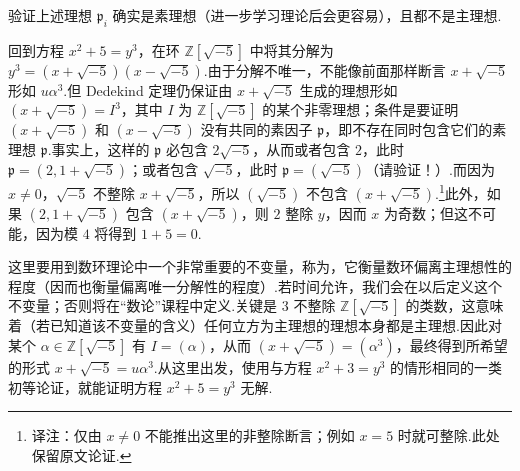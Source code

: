 \begin{exercise*}
验证上述理想 $\mathfrak p_i$ 确实是素理想（进一步学习理论后会更容易），且都不是主理想.
\end{exercise*}
回到方程 $x^2+5=y^3$，在环 $\mathbb Z[\sqrt{-5}]$ 中将其分解为 $y^3=(x+\sqrt{-5})(x-\sqrt{-5})$.由于分解不唯一，不能像前面那样断言 $x+\sqrt{-5}$ 形如 $u\alpha^3$.但 Dedekind 定理仍保证由 $x+\sqrt{-5}$ 生成的理想形如 $(x+\sqrt{-5})=I^3$，其中 $I$ 为 $\mathbb Z[\sqrt{-5}]$ 的某个非零理想；条件是要证明 $(x+\sqrt{-5})$ 和 $(x-\sqrt{-5})$ 没有共同的素因子 $\mathfrak p$，即不存在同时包含它们的素理想 $\mathfrak p$.事实上，这样的 $\mathfrak p$ 必包含 $2\sqrt{-5}$，从而或者包含 $2$，此时 $\mathfrak p=(2,1+\sqrt{-5})$；或者包含 $\sqrt{-5}$，此时 $\mathfrak p=(\sqrt{-5})$（请验证！）.而因为 $x\ne0$，$\sqrt{-5}$ 不整除 $x+\sqrt{-5}$，所以 $(\sqrt{-5})$ 不包含 $(x+\sqrt{-5})$.\footnote{译注：仅由 $x\ne0$ 不能推出这里的非整除断言；例如 $x=5$ 时就可整除.此处保留原文论证.}此外，如果 $(2,1+\sqrt{-5})$ 包含 $(x+\sqrt{-5})$，则 $2$ 整除 $y$，因而 $x$ 为奇数；但这不可能，因为模 $4$ 将得到 $1+5=0$.

这里要用到数环理论中一个非常重要的不变量，称为，它衡量数环偏离主理想性的程度（因而也衡量偏离唯一分解性的程度）.若时间允许，我们会在以后定义这个不变量；否则将在``数论''课程中定义.关键是 $3$ 不整除 $\mathbb Z[\sqrt{-5}]$ 的类数，这意味着（若已知道该不变量的含义）任何立方为主理想的理想本身都是主理想.因此对某个 $\alpha\in\mathbb Z[\sqrt{-5}]$ 有 $I=(\alpha)$，从而 $(x+\sqrt{-5})=(\alpha^3)$，最终得到所希望的形式 $x+\sqrt{-5}=u\alpha^3$.从这里出发，使用与方程 $x^2+3=y^3$ 的情形相同的一类初等论证，就能证明方程 $x^2+5=y^3$ 无解.
